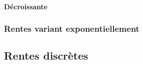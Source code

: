 \documentclass[10pt, french]{article}
\begin{document}
\begin{multicols*}{3}
\textbf{Décroissante}
%
%
%
%
%
%
%
%
%
%
%
%
%


\subsubsection*{\textcolor{amber(sae/ece)}{Rentes variant exponentiellement}}


\subsection*{Rentes discrètes}


\end{multicols*}
\end{document}
